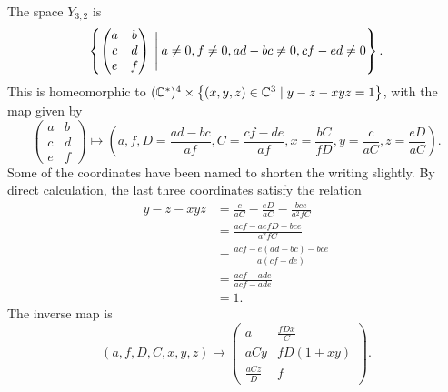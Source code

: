 \begin{example}
  \label{ex:32}

  The space $Y_{3,2}$ is
  \[\left\{ 
    \begin{pmatrix}
      a &b \\
      c & d \\
      e & f
    \end{pmatrix} \:\Bigg\vert\: a \neq 0, f \neq 0, ad-bc \neq
    0, cf-ed \neq 0 \right\}.
  \]
  This is homeomorphic to $(\mathbb{C}^*)^4\times \left\{ (x,y,z)\in\mathbb{C}^3 \mid
    y-z-xyz = 1 \right\}$, with the map given by
  \[
  \begin{pmatrix}
    a &b \\
    c & d \\
    e & f
  \end{pmatrix} \mapsto
  \left(a, f, D=\frac{ad-bc}{af}, C=\frac{cf-de}{af}, x=\frac{bC}{fD},
    y=\frac{c}{aC}, z=\frac{eD}{aC} \right). \]
  Some of the coordinates have been named to shorten the writing
  slightly. By direct calculation, the last three coordinates satisfy
  the relation
  \begin{align*}
    y-z-xyz &= \frac{c}{aC}-\frac{eD}{aC}-\frac{bce}{a^2fC} \\
            &= \frac{acf-aefD-bce}{a^2fC} \\
            &= \frac{acf-e(ad-bc)-bce}{a(cf-de)}  \\
            &= \frac{acf-ade}{acf-ade} \\
            &= 1.
  \end{align*}
  The inverse map is
  \[ (a,f,D,C,x,y,z) \mapsto
  \begin{pmatrix}
    a & \frac{fDx}{C} \\
    aCy & fD(1+xy) \\
    \frac{aCz}{D} & f
  \end{pmatrix}. \]


\end{example}
